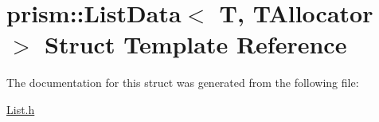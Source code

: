 \hypertarget{structprism_1_1_list_data}{}\section{prism\+:\+:List\+Data$<$ T, T\+Allocator $>$ Struct Template Reference}
\label{structprism_1_1_list_data}


The documentation for this struct was generated from the following file\+:\begin{DoxyCompactItemize}
\item 
\hyperlink{_list_8h}{List.\+h}\end{DoxyCompactItemize}
